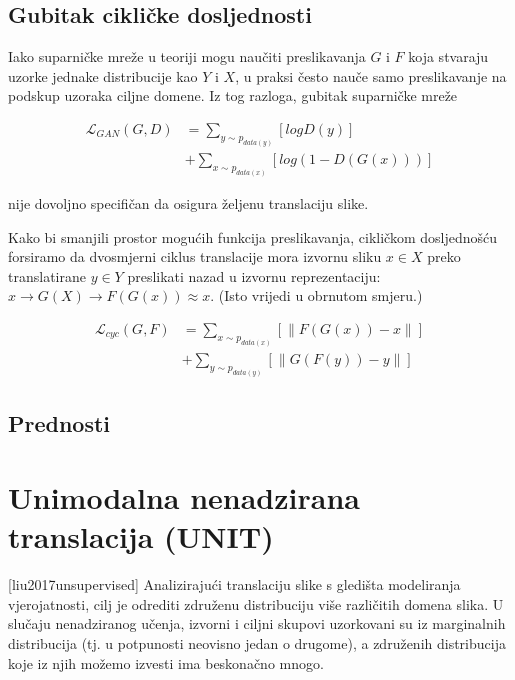 \documentclass[lmodern, utf8, seminar]{fer}
\newcommand{\Lagr}{\mathcal{L}}
\begin{document}
\subsection{Gubitak cikličke dosljednosti}
Iako suparničke mreže u teoriji mogu naučiti preslikavanja $G$ i $F$ koja stvaraju uzorke jednake distribucije kao $Y$ i $X$, u praksi često nauče samo preslikavanje na podskup uzoraka ciljne domene. Iz tog razloga, gubitak suparničke mreže 


\begin{equation}
\begin{split}
\Lagr_{GAN}(G, D) &= \sum_{y\sim p_{data(y)}}[log D(y)] \\
			     &+ \sum_{x\sim p_{data(x)}}[log(1 - D(G(x)))]
\end{split}
\end{equation}

nije dovoljno specifičan da osigura željenu translaciju slike.
\newline

Kako bi smanjili prostor mogućih funkcija preslikavanja, cikličkom dosljednošću forsiramo da dvosmjerni ciklus translacije mora izvornu sliku $x \in X$ preko translatirane $y \in Y$ preslikati nazad u izvornu reprezentaciju: $x \rightarrow G(X) \rightarrow F(G(x)) \approx x$. (Isto vrijedi u obrnutom smjeru.)

\begin{equation}
\begin{split}
\Lagr_{cyc}(G, F) &= \sum_{x\sim p_{data(x)}}[ \parallel F(G(x)) - x \parallel ] \\
			   &+ \sum_{y\sim p_{data(y)}}[ \parallel G(F(y)) - y \parallel ]
\end{split}
\end{equation}

\subsection{Prednosti}



\newpage
\section{Unimodalna nenadzirana translacija (UNIT)} [liu2017unsupervised]
Analizirajući translaciju slike s gledišta modeliranja vjerojatnosti, cilj je odrediti združenu distribuciju više različitih domena slika. U slučaju nenadziranog učenja, izvorni i ciljni skupovi uzorkovani su iz marginalnih distribucija (tj. u potpunosti neovisno jedan o drugome), a združenih distribucija koje iz njih možemo izvesti ima beskonačno mnogo.
\end{document}
